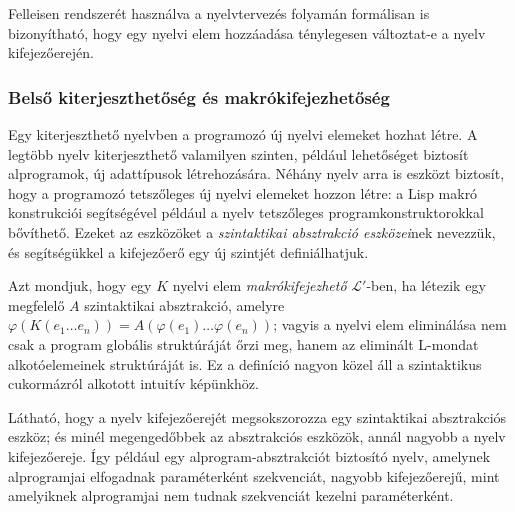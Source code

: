 Felleisen rendszerét használva a nyelvtervezés folyamán formálisan is bizonyítható, hogy egy nyelvi elem hozzáadása ténylegesen változtat-e a nyelv kifejezőerején.


\subsubsection{Belső kiterjeszthetőség és makrókifejezhetőség}
Egy kiterjeszthető nyelvben a programozó új nyelvi elemeket hozhat létre.
A legtöbb nyelv kiterjeszthető valamilyen szinten, például lehetőséget biztosít alprogramok, új adattípusok létrehozására.
Néhány nyelv arra is eszközt biztosít, hogy a programozó tetszőleges új nyelvi elemeket hozzon létre: a Lisp makró konstrukciói segítségével például a nyelv tetszőleges programkonstruktorokkal bővíthető.
Ezeket az eszközöket a \textit{szintaktikai absztrakció eszközei}nek nevezzük, és segítségükkel a kifejezőerő egy új szintjét definiálhatjuk.

Azt mondjuk, hogy egy $K$ nyelvi elem \textit{makrókifejezhető} $\mathcal{L}'$-ben, ha létezik egy megfelelő $A$ szintaktikai absztrakció, amelyre
$\varphi (K(e_1 \ldots e_n) ) = A(\varphi(e_1) \ldots \varphi(e_n))$; vagyis a nyelvi elem eliminálása nem csak a program globális struktúráját őrzi meg, hanem az eliminált L-mondat alkotóelemeinek struktúráját is\cite{Felleisen90}. Ez a definíció nagyon közel áll a szintaktikus cukormázról alkotott intuitív képünkhöz.

Látható, hogy a nyelv kifejezőerejét megsokszorozza egy szintaktikai absztrakciós eszköz; és minél megengedőbbek az absztrakciós eszközök, annál nagyobb a nyelv kifejezőereje. Így például egy alprogram-absztrakciót biztosító nyelv, amelynek alprogramjai elfogadnak paraméterként szekvenciát, nagyobb kifejezőerejű, mint amelyiknek alprogramjai nem tudnak szekvenciát kezelni paraméterként. %


